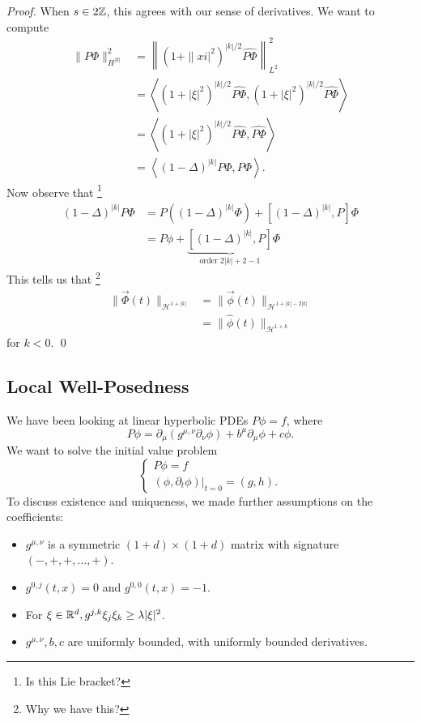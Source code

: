 \begin{proof}
    \vspace{1em}
    When $s\in 2\mathbb{Z}$, this agrees with our sense of derivatives.
    We want to compute
$$
\begin{aligned}
\|P \Phi\|_{H^{|k|}}^{2} &=\left\|\left(1+\|\left. x i\right|^{2}\right)^{|k| / 2} \widehat{P \Phi}\right\|_{L^{2}}^{2} \\
&=\left\langle\left(1+|\xi|^{2}\right)^{|k| / 2} \widehat{P \Phi},\left(1+|\xi|^{2}\right)^{|k| / 2} \widehat{P \Phi}\right\rangle \\
&=\left\langle\left(1+|\xi|^{2}\right)^{|k| / 2} \widehat{P \Phi}, \widehat{P \Phi}\right\rangle \\
&=\left\langle(1-\Delta)^{|k|} P \Phi, P \Phi\right\rangle .
\end{aligned}
$$
Now observe that \footnote{Is this Lie bracket?}
$$
\begin{aligned}
(1-\Delta)^{|k|} P \Phi &=P\left((1-\Delta)^{|k|} \Phi\right)+\left[(1-\Delta)^{|k|}, P\right] \Phi \\
&=P \phi+\underbrace{\left[(1-\Delta)^{|k|}, P\right]}_{\text {order } 2|k|+2-1} \Phi
\end{aligned}
$$
This tells us that \footnote{Why we have this?}
$$
\begin{aligned}
\|\vec{\Phi}(t)\|_{\mathcal{H}^{1+|k|}} &=\|\vec{\phi}(t)\|_{\mathcal{H}^{1+|k|-2|k|}} \\
&=\|\widehat{\phi}(t)\|_{\mathcal{H}^{1+k}}
\end{aligned}
$$
for $k<0$.
\qed 
\end{proof}

 \subsection{Local Well-Posedness}

 We have been looking at linear hyperbolic PDEs $P \phi=f$, where
$$
P \phi=\partial_{\mu}\left(g^{\mu, \nu} \partial_{\nu} \phi\right)+b^{\mu} \partial_{\mu} \phi+c \phi .
$$
We want to solve the initial value problem
$$
\left\{\begin{array}{l}
P \phi=f \\
\left.\left(\phi, \partial_{t} \phi\right)\right|_{t=0}=(g, h) .
\end{array}\right.
$$
To discuss existence and uniqueness, we made further assumptions on the coefficients:
\begin{itemize}
    \item $g^{\mu,\nu}$ is a symmetric $(1+d)\times (1+d)$ matrix with signature $(-,+,+,\dots, +)$. 
    \item $g^{0,j}(t,x) = 0$ and $g^{0,0}(t,x)=-1$. 
    \item For $\xi\in \mathbb{R}^d, g^{j,k}\xi_j\xi_k \ge \lambda |\xi|^2$. 
    \item $g^{\mu,\nu},b,c$ are uniformly bounded, with uniformly bounded derivatives.
\end{itemize}


